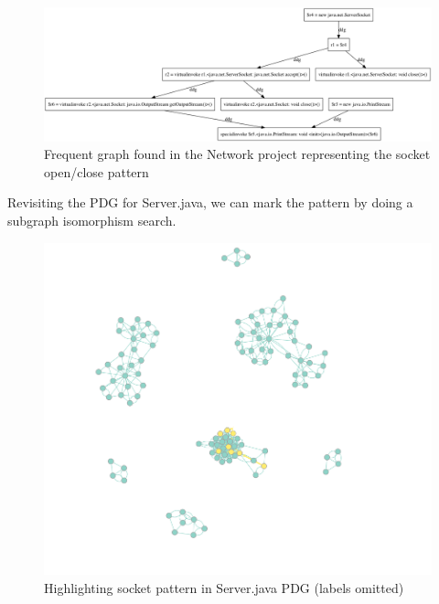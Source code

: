 \documentclass[12pt]{article}
\begin{document}
\begin{figure}[H]
\centerline{
\includegraphics[width=\linewidth]{patterns/networking_pattern.png}
}
\caption{\label{socket_pattern}
    Frequent graph found in the Network project representing the socket open/close pattern
}
\end{figure}

Revisiting the PDG for Server.java, we can mark the pattern by doing a subgraph isomorphism search.

\begin{figure}[H]
\centerline{
\includegraphics[width=\linewidth]{patterns/networking_isomorphism_full.png}
}
\caption{\label{networking_isomorphism}
    Highlighting socket pattern in Server.java PDG (labels omitted)
}
\end{figure}
\end{document}
